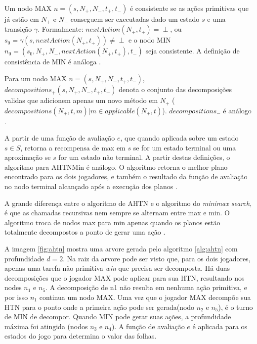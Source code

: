 Um nodo MAX $n = (s, N_{+}, N_{-}, t_{+}, t_{-})$ é consistente se as ações primitivas que já estão em $N_{+}$ e $N_{-}$ conseguem ser executadas dado um estado $s$ e uma transição $\gamma$. Formalmente: $nextAction(N_{+}, t_{+}) = \perp$, ou $s_{0} = \gamma(s, nextAction(N_{+}, t_{+})) \neq \perp$ e o nodo MIN $n_{0} = (s_{0}, N_{+}, N_{-}, nextAction(N_{+}, t_{+}), t_{-})$ seja consistente. A definição de consistência de MIN é análoga \cite{ontanon2015adversarial}.

Para um nodo MAX $n = (s, N_{+}, N_{-}, t_{+}, t_{-})$, $decompositions_{+}(s, N_{+}, N_{-}, t_{+}, t_{-})$ denota o conjunto das decomposições validas que adicionem apenas um novo método em $N_{+}$ (${decompositions(N_{+}, t, m) | m \in applicable(N_{+}, t)}$).  $decompositions_{-}$ é análogo \cite{ontanon2015adversarial}.

A partir de uma função de avaliação $e$, que quando aplicada sobre um estado $s \in S$, retorna a recompensa de max em $s$ se for um estado terminal ou uma aproximação se $s$ for um estado não terminal. A partir destas definições, o algoritmo para AHTNMin é análogo. O algoritmo retorna o melhor plano encontrado para os dois jogadores, e também o resultado da função de avaliação no nodo terminal alcançado após a execução dos planos \cite{ontanon2015adversarial}. 


A grande diferença entre o algoritmo de AHTN e o algoritmo do \textit{minimax search}, é que as chamadas recursivas nem sempre se alternam entre max e min. O algoritmo troca de nodos max para min apenas quando os planos estão totalmente decompostos a ponto de gerar uma ação \cite{ontanon2015adversarial}.


A imagem \ref{fig:ahtn} mostra uma arvore gerada pelo algoritmo \ref{alg:ahtn} com profundidade $d = 2$. Na raiz da arvore pode ser visto que, para os dois jogadores, apenas uma tarefa não primitiva \textit{win} que precisa ser decomposta. Há duas decomposições que o jogador MAX pode aplicar para sua HTN, resultando nos nodes $n_{1}$ e $n_{5}$. A decomposição de n1 não resulta em nenhuma ação primitiva, e por isso $n_{1}$ continua um nodo MAX. Uma vez que o jogador MAX decompõe sua HTN para o ponto onde a primeira ação pode ser gerada(nodo $n_{2}$ e $n_{5}$), é o turno de MIN de decompor. Quando MIN pode gerar suas ações, a profundidade máxima foi atingida (nodos $n_{3}$ e $n_{4}$). A função de avaliação $e$ é aplicada para os estados do jogo para determina o valor das folhas.


